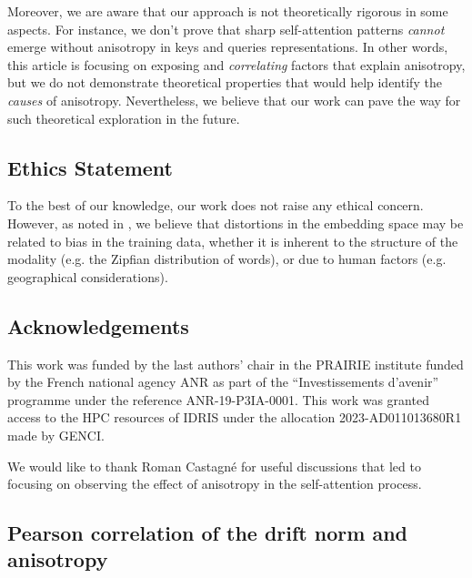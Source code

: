 Moreover, we are aware that our approach is not theoretically rigorous in some aspects. For instance, we don't prove that sharp self-attention patterns \textit{cannot} emerge without anisotropy in keys and queries representations. In other words, this article is focusing on exposing and \textit{correlating} factors that explain anisotropy, but we do not demonstrate theoretical properties that would help identify the \textit{causes} of anisotropy. Nevertheless, we believe that our work can pave the way for such theoretical exploration in the future.


\subsection*{Ethics Statement}
To the best of our knowledge, our work does not raise any ethical concern. However, as noted in \citet{zhou2021freqbased}, we believe that distortions in the embedding space may be related to bias in the training data, whether it is inherent to the structure of the modality (e.g. the Zipfian distribution of words), or due to human factors (e.g. geographical considerations).

\subsection*{Acknowledgements}
This work was funded by the last authors' chair in the PRAIRIE institute funded by the French national agency ANR as part of the ``Investissements d'avenir'' programme under the reference ANR-19-P3IA-0001. This work was granted access to the HPC resources of IDRIS under the allocation 2023-AD011013680R1 made by GENCI.

We would like to thank Roman Castagné for useful discussions that led to focusing on observing the effect of anisotropy in the self-attention process.



\subsection{Pearson correlation of the drift norm and anisotropy}
\label{app:pearson}


